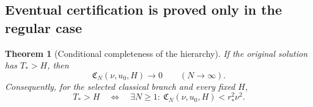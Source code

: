\documentclass[11pt,a4paper]{article}
\newtheorem{theorem}{Theorem}[section]
\theoremstyle{definition}\newtheorem{definition}[theorem]{Definition}
\theoremstyle{remark}\newtheorem{remark}[theorem]{Remark}
\newcommand{\rstar}{r_*}
\numberwithin{equation}{section}
\begin{document}
\subsection{Eventual certification is proved only in the regular case}
\begin{theorem}[Conditional completeness of the hierarchy]\label{thm:complete}
If the original solution has $T_*>H$, then
\begin{equation}\label{eq:CNzero}
 \mathfrak C_N(\nu,u_0,H)\longrightarrow0\qquad(N\to\infty).
\end{equation}
Consequently, for the selected classical branch and every fixed $H$,
\begin{equation}\label{eq:equiv}
 T_*>H\quad\Longleftrightarrow\quad
 \exists N\ge1:\ \mathfrak C_N(\nu,u_0,H)<\rstar^2\nu^2.
\end{equation}
\end{theorem}
\end{document}
